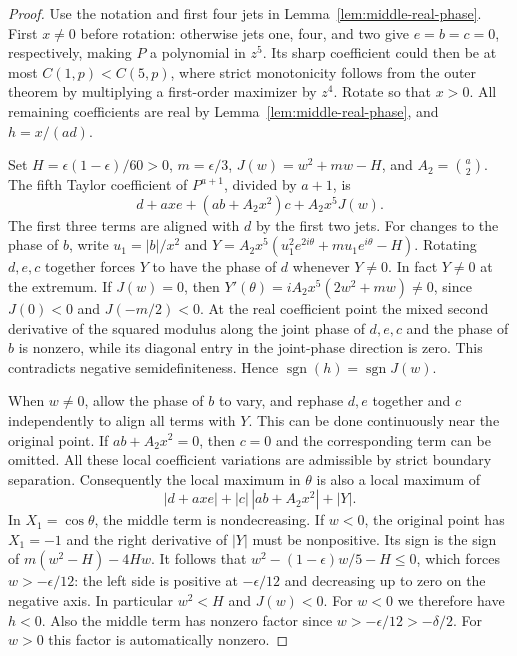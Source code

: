 \documentclass[11pt]{article}
\begin{document}
\begin{proof}
Use the notation and first four jets in Lemma~\ref{lem:middle-real-phase}.
First \(x\ne0\) before rotation: otherwise jets one, four, and
two give \(e=b=c=0\), respectively, making \(P\) a polynomial
in \(z^5\). Its sharp coefficient could then be at most
\(C(1,p)<C(5,p)\), where strict monotonicity follows from the
outer theorem by multiplying a first-order maximizer by \(z^4\).
Rotate so that \(x>0\). All remaining coefficients are real by
Lemma~\ref{lem:middle-real-phase}, and \(h=x/(ad)\).

Set \(H=\epsilon(1-\epsilon)/60>0\),
\(m=\epsilon/3\), \(J(w)=w^2+mw-H\), and \(A_2=\binom a2\).
The fifth Taylor coefficient of \(P^{a+1}\), divided by \(a+1\), is
\[
 d+axe+(ab+A_2 x^2)c+A_2x^5 J(w).
\]
The first three terms are aligned with \(d\) by the first two
jets. For changes to the phase of \(b\), write \(u_1=|b|/x^2\)
and \(Y=A_2x^5(u_1^2e^{2i\theta}+mu_1e^{i\theta}-H)\).
Rotating \(d,e,c\) together forces \(Y\) to have the phase of
\(d\) whenever \(Y\ne0\).
In fact \(Y\ne0\) at the extremum. If \(J(w)=0\), then
\(Y'(\theta)=i A_2x^5(2w^2+mw)\ne0\), since
\(J(0)<0\) and \(J(-m/2)<0\).
At the real coefficient point the mixed second derivative of
the squared modulus along the joint phase of \(d,e,c\) and
the phase of \(b\) is nonzero, while its diagonal entry in
the joint-phase direction is zero. This contradicts negative
semidefiniteness. Hence \(\operatorname{sgn}(h)=\operatorname{sgn}J(w)\).

When \(w\ne0\), allow the phase of \(b\) to vary, and rephase
\(d,e\) together and \(c\) independently to align all terms
with \(Y\). This can be done continuously near the original
point. If \(ab+A_2x^2=0\), then \(c=0\) and the corresponding
term can be omitted. All these local coefficient variations
are admissible by strict boundary separation. Consequently the
local maximum in \(\theta\) is also a local maximum of
\[
 |d+axe|+|c|\,|ab+A_2x^2|+|Y|.
\]
In \(X_1=\cos\theta\), the middle term is nondecreasing. If
\(w<0\), the original point has \(X_1=-1\) and the right
derivative of \(|Y|\) must be nonpositive. Its sign is the
sign of \(m(w^2-H)-4Hw\). It follows that
\(w^2-(1-\epsilon)w/5-H\le0\), which forces \(w>-\epsilon/12\):
the left side is positive at \(-\epsilon/12\) and decreasing
up to zero on the negative axis. In particular \(w^2<H\) and
\(J(w)<0\). For \(w<0\) we therefore have \(h<0\).
Also the middle term has nonzero factor since
\(w>-\epsilon/12>-\delta/2\).
For \(w>0\) this factor is automatically nonzero.


\end{proof}
\end{document}
